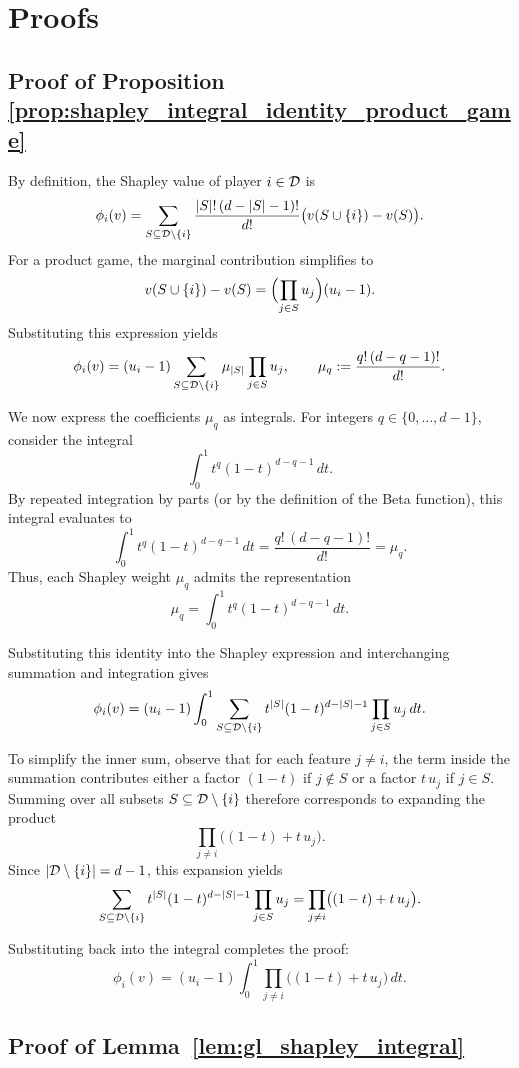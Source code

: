 \section{Proofs}\label{apx:proofs}

\subsection*{Proof of Proposition \ref{prop:shapley_integral_identity_product_game}}
By definition, the Shapley value of player $i\in\mathcal{D}$ is
\[
\phi_i(v)
=
\sum_{S\subseteq \mathcal{D}\setminus\{i\}}
\frac{|S|!\,(d-|S|-1)!}{d!}
\bigl(v(S\cup\{i\})-v(S)\bigr).
\]
For a product game, the marginal contribution simplifies to
\[
v(S\cup\{i\})-v(S)
=
\Bigl(\prod_{j\in S}u_j\Bigr)(u_i-1).
\]
Substituting this expression yields
\[
\phi_i(v)
=
(u_i-1)
\sum_{S\subseteq \mathcal{D}\setminus\{i\}}
\mu_{|S|}
\prod_{j\in S}u_j,
\qquad
\mu_q := \frac{q!\,(d-q-1)!}{d!}.
\]

We now express the coefficients $\mu_q$ as integrals. For integers
$q\in\{0,\dots,d-1\}$, consider the integral
\[
\int_0^1 t^q(1-t)^{d-q-1}\,dt.
\]
By repeated integration by parts (or by the definition of the Beta function),
this integral evaluates to
\[
\int_0^1 t^q(1-t)^{d-q-1}\,dt
=
\frac{q!\,(d-q-1)!}{d!}
=
\mu_q.
\]
Thus, each Shapley weight $\mu_q$ admits the representation
\[
\mu_q
=
\int_0^1 t^q(1-t)^{d-q-1}\,dt.
\]

Substituting this identity into the Shapley expression and interchanging
summation and integration gives
\[
\phi_i(v)
=
(u_i-1)
\int_0^1
\sum_{S\subseteq \mathcal{D}\setminus\{i\}}
t^{|S|}(1-t)^{d-|S|-1}
\prod_{j\in S}u_j
\,dt.
\]

To simplify the inner sum, observe that for each feature $j\neq i$, the term
inside the summation contributes either a factor $(1-t)$ if $j\notin S$ or
a factor $t\,u_j$ if $j\in S$. Summing over all subsets
$S\subseteq \mathcal{D}\setminus\{i\}$ therefore corresponds to expanding the product
\[
\prod_{j\neq i}\bigl((1-t)+t\,u_j\bigr).
\]
Since $|\mathcal{D}\setminus\{i\}|=d-1$, this expansion yields
\[
\sum_{S\subseteq \mathcal{D}\setminus\{i\}}
t^{|S|}(1-t)^{d-|S|-1}\prod_{j\in S}u_j
=
\prod_{j\neq i}\bigl((1-t)+t\,u_j\bigr).
\]

Substituting back into the integral completes the proof:
\[
\phi_i(v)
=
(u_i-1)
\int_0^1
\prod_{j\neq i}\bigl((1-t)+t\,u_j\bigr)\,dt.
\]

\subsection*{Proof of Lemma~\ref{lem:gl_shapley_integral}}

